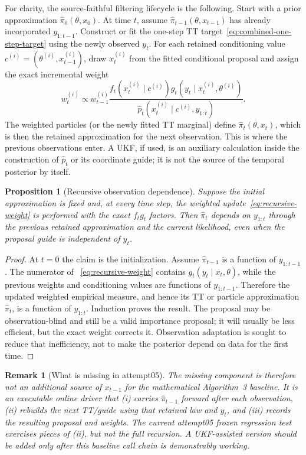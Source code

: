 \documentclass[11pt]{article}
\newtheorem{proposition}{Proposition}
\newtheorem{remark}{Remark}
\begin{document}
For clarity, the source-faithful filtering lifecycle is the following. Start
with a prior approximation $\widehat\pi_0(\theta,x_0)$. At time $t$, assume
$\widehat\pi_{t-1}(\theta,x_{t-1})$ has already incorporated
$y_{1:t-1}$. Construct or fit the one-step TT target~\eqref{eq:combined-one-step-target}
using the newly observed $y_t$. For each retained conditioning value
$c^{(i)}=(\theta^{(i)},x_{t-1}^{(i)})$, draw $x_t^{(i)}$ from the fitted
conditional proposal and assign the exact incremental weight
\begin{equation}
 w_t^{(i)}\propto w_{t-1}^{(i)}
 \frac{f_t(x_t^{(i)}\mid c^{(i)})
       g_t(y_t\mid x_t^{(i)},\theta^{(i)})}
      {\widehat p_t(x_t^{(i)}\mid c^{(i)},y_{1:t})}.
 \label{eq:recursive-weight}
\end{equation}
The weighted particles (or the newly fitted TT marginal) define
$\widehat\pi_t(\theta,x_t)$, which is then the retained approximation for the
next observation. This is where the previous observations enter. A UKF, if
used, is an auxiliary calculation inside the construction of
$\widehat p_t$ or its coordinate guide; it is not the source of the temporal
posterior by itself.

\begin{proposition}[Recursive observation dependence]
\label{prop:recursive-observation}
Suppose the initial approximation is fixed and, at every time step, the
weighted update~\eqref{eq:recursive-weight} is performed with the exact
$f_tg_t$ factors. Then $\widehat\pi_t$ depends on $y_{1:t}$ through the
previous retained approximation and the current likelihood, even when the
proposal guide is independent of $y_t$.
\end{proposition}
\begin{proof}
At $t=0$ the claim is the initialization. Assume
$\widehat\pi_{t-1}$ is a function of $y_{1:t-1}$. The numerator of
~\eqref{eq:recursive-weight} contains $g_t(y_t\mid x_t,\theta)$, while the
previous weights and conditioning values are functions of $y_{1:t-1}$.
Therefore the updated weighted empirical measure, and hence its TT or
particle approximation $\widehat\pi_t$, is a function of $y_{1:t}$. Induction
proves the result. The proposal may be observation-blind and still be a valid
importance proposal; it will usually be less efficient, but the exact weight
corrects it. Observation adaptation is sought to reduce that inefficiency,
not to make the posterior depend on data for the first time.
\end{proof}

\begin{remark}[What is missing in attempt05]
The missing component is therefore not an additional source of
$x_{t-1}$ for the mathematical Algorithm~3 baseline. It is an executable
online driver that (i) carries $\widehat\pi_{t-1}$ forward after each
observation, (ii) rebuilds the next TT/guide using that retained law and
$y_t$, and (iii) records the resulting proposal and weights. The current
attempt05 frozen regression test exercises pieces of (ii), but not the full
recursion. A UKF-assisted version should be added only after this baseline
call chain is demonstrably working.
\end{remark}
\end{document}
